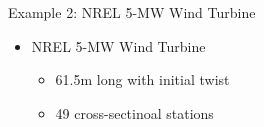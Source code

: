 \documentclass[xcolor=cmyk]{beamer}
\begin{document}
\begin{frame}{Example 2: NREL 5-MW Wind Turbine}
     \begin{itemize}
         \item NREL 5-MW Wind Turbine
             \begin{itemize}
                 \item 61.5m long with initial twist
                 \item 49 cross-sectinoal stations
             \end{itemize}
    \end{itemize}  
\end{frame}
\end{document}
